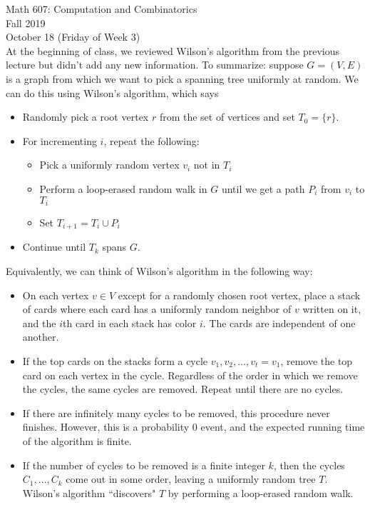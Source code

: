 \documentclass[12pt]{article}
\theoremstyle{definition}
\begin{document}
Math 607: Computation and Combinatorics \\
Fall 2019 \\
October 18 (Friday of Week 3) \\

At the beginning of class, we reviewed Wilson's algorithm from the previous lecture but didn't add any new information. To summarize: suppose $G = (V, E)$ is a graph from which we want to pick a spanning tree uniformly at random. We can do this using Wilson's algorithm, which says \begin{itemize}
	\item Randomly pick a root vertex $r$ from the set of vertices and set $T_0 = \{r\}$.
	\item For incrementing $i$, repeat the following: \begin{itemize}
		\item Pick a uniformly random vertex $v_i$ not in $T_i$
		\item Perform a loop-erased random walk in $G$ until we get a path $P_i$ from $v_i$ to $T_i$
		\item Set $T_{i+1} = T_i \cup P_i$
		\end {itemize}
	\item Continue until $T_k$ spans $G$.
	\end{itemize}
	
Equivalently, we can think of Wilson's algorithm in the following way:	
\begin{itemize}
	\item On each vertex $v \in V$ except for a randomly chosen root vertex, place a stack of cards where each card has a uniformly random neighbor of $v$ written on it, and the $i$th card in each stack has color $i$. The cards are independent of one another.
	\item If the top cards on the stacks form a cycle $v_1, v_2, \dots, v_t = v_1$, remove the top card on each vertex in the cycle. Regardless of the order in which we remove the cycles, the same cycles are removed. Repeat until there are no cycles. 
	\item If there are infinitely many cycles to be removed, this procedure never finishes. However, this is a probability 0 event, and the expected running time of the algorithm is finite.
	\item If the number of cycles to be removed is a finite integer $k$, then the cycles $C_1, \dots, C_k$ come out in some order, leaving a uniformly random tree $T$. Wilson's algorithm ``discovers" $T$ by performing a loop-erased random walk.
\end{itemize}
\end{document}
